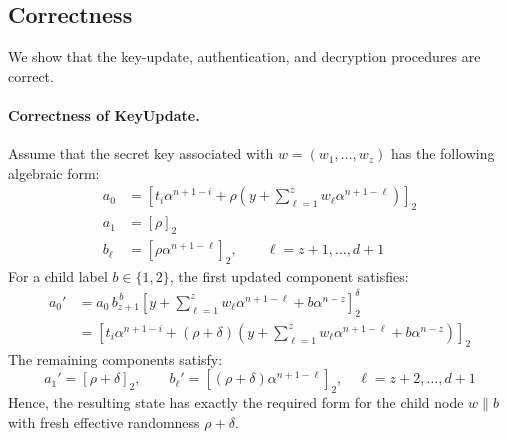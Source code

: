 \documentclass[sigconf,anonymous]{acmart}
\theoremstyle{definition}
\theoremstyle{definition}
\theoremstyle{definition}
\theoremstyle{definition}
\theoremstyle{definition}
\theoremstyle{definition}
\theoremstyle{definition}
\theoremstyle{definition}
\theoremstyle{definition}
\begin{document}
\subsection{Correctness}

We show that the key-update, authentication, and decryption procedures
are correct.

\paragraph{Correctness of KeyUpdate.}
Assume that the secret key associated with
$w=(w_1,\ldots,w_z)$ has the following algebraic form:
\[
\begin{aligned}
	a_0
	&=
	\left[
	t_i\alpha^{n+1-i}
	+
	\rho
	\left(
	y+\sum_{\ell=1}^{z}
	w_\ell\alpha^{n+1-\ell}
	\right)
	\right]_2
	\\
	a_1
	&=
	[\rho]_2
	\\
	b_\ell
	&=
	[\rho\alpha^{n+1-\ell}]_2,
	\qquad
	\ell=z+1,\ldots,d+1
\end{aligned}
\]
For a child label $b\in\{1,2\}$, the first updated component satisfies:
\[
\begin{aligned}
	a_0'
	&=
	a_0\,b_{z+1}^{\,b}
	\left[
	y+
	\sum_{\ell=1}^{z}
	w_\ell\alpha^{n+1-\ell}
	+
	b\alpha^{n-z}
	\right]_2^\delta
	\\
	&=
	\left[
	t_i\alpha^{n+1-i}
	+
	(\rho+\delta)
	\left(
	y+
	\sum_{\ell=1}^{z}
	w_\ell\alpha^{n+1-\ell}
	+
	b\alpha^{n-z}
	\right)
	\right]_2
\end{aligned}
\]
The remaining components satisfy:
\[
a_1'=[\rho+\delta]_2,
\qquad
b_\ell'=
[(\rho+\delta)\alpha^{n+1-\ell}]_2,
\quad
\ell=z+2,\ldots,d+1
\]
Hence, the resulting state has exactly the required form for the child
node $w\|b$ with fresh effective randomness $\rho+\delta$.
\end{document}
